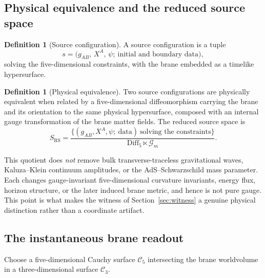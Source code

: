 \documentclass[11pt,a4paper]{article}
\theoremstyle{plain}
\theoremstyle{definition}
\newtheorem{definition}[theorem]{Definition}
\newcommand{\RS}{\mathrm{RS}}
\newcommand{\Diff}{\mathrm{Diff}}
\begin{document}
\subsection{Physical equivalence and the reduced source space}

\begin{definition}[Source configuration]
\label{def:source}
A source configuration is a tuple
\begin{equation}
\label{eq:sourcetuple}
s=\bigl(g_{AB},\,X^A,\,\psi;\ \text{initial and boundary data}\bigr),
\end{equation}
solving the five-dimensional constraints, with the brane embedded as a
timelike hypersurface.
\end{definition}

\begin{definition}[Physical equivalence]
\label{def:equiv}
Two source configurations are physically equivalent when related by a
five-dimensional diffeomorphism carrying the brane and its orientation to
the same physical hypersurface, composed with an internal gauge
transformation of the brane matter fields. The reduced source space is
\begin{equation}
\label{eq:Sspace}
S_{\RS}
=\frac{\{(g_{AB},X^A,\psi;\ \text{data})\ \text{solving the constraints}\}}
{\Diff_5\ltimes\mathcal G_m}.
\end{equation}
\end{definition}

This quotient does \emph{not} remove bulk transverse-traceless
gravitational waves, Kaluza--Klein continuum amplitudes, or the
AdS--Schwarzschild mass parameter. Each changes gauge-invariant
five-dimensional curvature invariants, energy flux, horizon structure, or
the later induced brane metric, and hence is not pure gauge. This point
is what makes the witness of Section~\ref{sec:witness} a genuine physical
distinction rather than a coordinate artifact.

\subsection{The instantaneous brane readout}
\label{sec:readout}

Choose a five-dimensional Cauchy surface $\mathcal C_5$ intersecting the
brane worldvolume in a three-dimensional surface $\mathcal C_3$.
\end{document}
